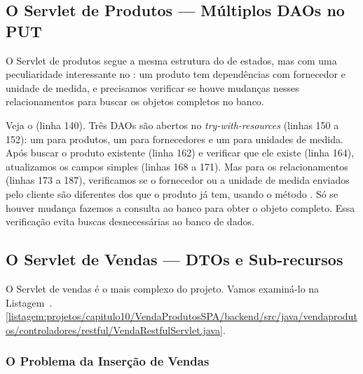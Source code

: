 \subsection{O Servlet de Produtos --- Múltiplos DAOs no PUT}

O Servlet de produtos segue a mesma estrutura do de estados, mas com uma peculiaridade interessante no : um produto tem dependências com fornecedor e unidade de medida, e precisamos verificar se houve mudanças nesses relacionamentos para buscar os objetos completos no banco.


Veja o  (linha 140). Três DAOs são abertos no \textit{try-with-resources} (linhas 150 a 152): um para produtos, um para fornecedores e um para unidades de medida. Após buscar o produto existente (linha 162) e verificar que ele existe (linha 164), atualizamos os campos simples (linhas 168 a 171). Mas para os relacionamentos (linhas 173 a 187), verificamos se o fornecedor ou a unidade de medida enviados pelo cliente são diferentes dos que o produto já tem, usando o método . Só se houver mudança fazemos a consulta ao banco para obter o objeto completo. Essa verificação evita buscas desnecessárias ao banco de dados.


\subsection{O Servlet de Vendas --- DTOs e Sub-recursos}

O Servlet de vendas é o mais complexo do projeto. Vamos examiná-lo na Listagem~\thechapter.\ref{listagem:projetos/capitulo10/VendaProdutosSPA/backend/src/java/vendaprodutos/controladores/restful/VendaRestfulServlet.java}.


\subsubsection{O Problema da Inserção de Vendas}

